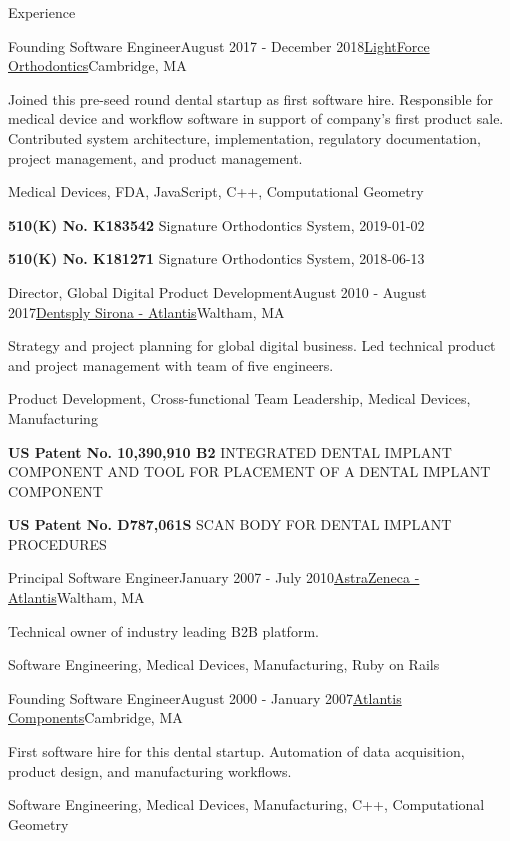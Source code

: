 \documentclass{resume}
\begin{document}
\begin{rSection}{Experience}
\begin{rSubsection}{Founding Software Engineer}{August 2017 - December 2018}{\href{https://lightforceortho.com}{LightForce Orthodontics}}{Cambridge, MA}
\item Joined this pre-seed round dental startup as first software hire. Responsible for medical device and workflow software in support of company's first product sale. Contributed system architecture, implementation, regulatory documentation, project management, and product management.
\item Medical Devices, FDA, JavaScript, C++, Computational Geometry
\item \textbf{510(K) No. K183542} Signature Orthodontics System, 2019-01-02
\item \textbf{510(K) No. K181271} Signature Orthodontics System, 2018-06-13
\end{rSubsection}

\begin{rSubsection}{Director, Global Digital Product Development}{August 2010 - August 2017}{\href{https://dentsplysirona.com}{Dentsply Sirona - Atlantis}}{Waltham, MA}
\item Strategy and project planning for global digital business. Led technical product and project management with team of five engineers.
\item Product Development, Cross-functional Team Leadership, Medical Devices, Manufacturing
\item \textbf{US Patent No. 10,390,910 B2} INTEGRATED DENTAL IMPLANT COMPONENT AND TOOL FOR PLACEMENT OF A DENTAL IMPLANT COMPONENT
\item \textbf{US Patent No. D787,061S} SCAN BODY FOR DENTAL IMPLANT PROCEDURES
\end{rSubsection}

\begin{rSubsection}{Principal Software Engineer}{January 2007 - July 2010}{\href{https://astrazeneca.com}{AstraZeneca - Atlantis}}{Waltham, MA}
\item Technical owner of industry leading B2B platform.
\item Software Engineering, Medical Devices, Manufacturing, Ruby on Rails
\end{rSubsection}

\begin{rSubsection}{Founding Software Engineer}{August 2000 - January 2007}{\href{https://dentsplysirona.com}{Atlantis Components}}{Cambridge, MA}
\item First software hire for this dental startup. Automation of data acquisition, product design, and manufacturing workflows.
\item Software Engineering, Medical Devices, Manufacturing, C++, Computational Geometry
\end{rSubsection}


\end{rSection}
\end{document}
